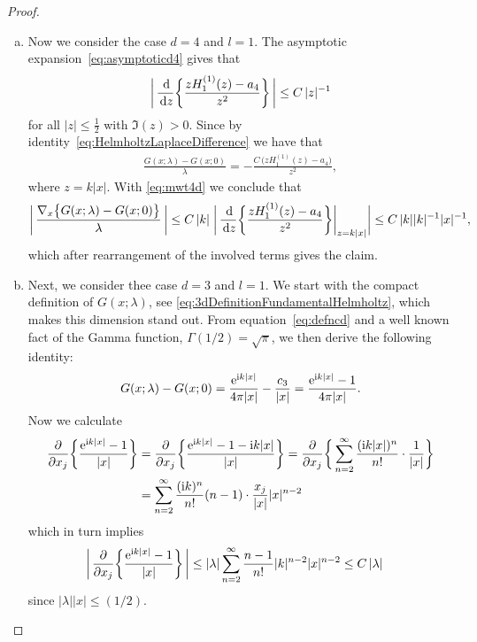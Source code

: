 \begin{proof}
\begin{enumerate}[(a)]
  \item Now we consider the case $d = 4$ and $l = 1$.
    The asymptotic expansion~\eqref{eq:asymptoticd4} gives that
    \begin{align}
      \label{eq:mwt4d}
      \bigg|\, \frac{\, {\operatorname{d}\!{}}}{\, {\operatorname{d}\!{z}}} \bigg\{ \frac{z H_1^{(1)}(z) - a_4}{z^2} \bigg\} \, \bigg| \leq C\, |z|^{-1}
    \end{align}
    for all $|z| \leq \frac{1}{2}$ with $\Im(z) > 0$.
    Since by identity~\eqref{eq:HelmholtzLaplaceDifference} we have that
    \begin{align*}
      \frac{G(x; \lambda) - G(x; 0)}{\lambda} = - \frac{C \, \big(z H_1^{(1)}(z) - a_4 \big)}{z^2},
    \end{align*}
    where $z = k |x|$. With \eqref{eq:mwt4d} we conclude that
    \begin{align*}
      \bigg|\,\frac{\nabla_x \big\{ G(x; \lambda) - G(x; 0) \big\}}{\lambda} \,\bigg|
      \leq C\, |k| \; \bigg|\, \frac{\, {\operatorname{d}\!{}}}{\, {\operatorname{d}\!{z}}} \bigg\{ \frac{z H_1^{(1)}(z) - a_4}{z^2} \bigg\} \bigg|_{z = k|x|} \bigg|
      \leq C\, |k| |k|^{-1} |x|^{-1},
    \end{align*}
    which after rearrangement of the involved terms gives the claim.

  \item Next, we consider thee case $d = 3$ and $l = 1$. 
    We start with the compact definition of $G(x; \lambda)$, see \eqref{eq:3dDefinitionFundamentalHelmholtz}, which makes this dimension stand out.  
    From equation~\eqref{eq:defncd} and a well known fact of the Gamma function, $\Gamma(1/2) = \sqrt{\pi}$, we then derive the following identity:
    \begin{align*}
      G(x;\lambda) - G(x; 0) = \frac{\mathrm{e}^{\mathrm{i} k |x|}}{4\pi |x|} - \frac{c_3}{|x|} = \frac{\mathrm{e}^{\mathrm{i} k|x|} - 1}{4 \pi |x|}.
    \end{align*}
    Now we calculate
    \begin{align*}
      \frac{\partial}{\partial x_j} \bigg\{ \frac{\mathrm{e}^{\mathrm{i} k|x|} - 1}{|x|} \bigg\} 
      &= \frac{\partial}{\partial x_j} \bigg\{ \frac{\mathrm{e}^{\mathrm{i} k |x|} - 1 - \mathrm{i} k |x|}{|x|} \bigg\} 
      = \frac{\partial}{\partial x_j} \bigg\{ \sum_{n = 2}^\infty \frac{(\mathrm{i} k |x|)^n}{n!} \cdot \frac{1}{|x|} \bigg\} \\
      &= \sum_{n = 2}^\infty \frac{(\mathrm{i} k)^n}{n!} (n - 1) \cdot \frac{x_j}{|x|} |x|^{n - 2} 
    \end{align*}
    which in turn implies 
    \begin{align*}
      \bigg| \,\frac{\partial}{\partial x_j} \bigg\{ \frac{\mathrm{e}^{\mathrm{i} k |x|} - 1}{|x|} \bigg\} \,\bigg|
      &\leq |\lambda| \sum_{n = 2}^\infty \frac{n - 1}{n!} |k|^{n - 2} |x|^{n - 2} 
      \leq C \, |\lambda|
    \end{align*}
    since $|\lambda||x| \leq (1/2)$.


\end{enumerate}
\end{proof}
